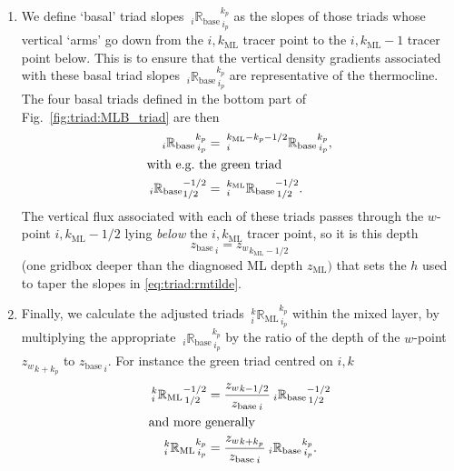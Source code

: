 \begin{enumerate}
\item We define `basal' triad slopes
${\:}_i{\mathbb{R}_\mathrm{base}}_{\,i_p}^{k_p}$ as the slopes
of those triads whose vertical `arms' go down from the
$i,k_\mathrm{ML}$ tracer point to the $i,k_\mathrm{ML}-1$ tracer point
below. This is to ensure that the vertical density gradients
associated with these basal triad slopes
${\:}_i{\mathbb{R}_\mathrm{base}}_{\,i_p}^{k_p}$ are
representative of the thermocline. The four basal triads defined in the bottom part
of Fig.~\ref{fig:triad:MLB_triad} are then
\begin{align}
  {\:}_i{\mathbb{R}_\mathrm{base}}_{\,i_p}^{k_p} &=
 {\:}^{k_\mathrm{ML}-k_p-1/2}_i{\mathbb{R}_\mathrm{base}}_{\,i_p}^{k_p}, \label{eq:triad:Rbase}
\\
\intertext{with e.g.\ the green triad}
{\:}_i{\mathbb{R}_\mathrm{base}}_{1/2}^{-1/2}&=
{\:}^{k_\mathrm{ML}}_i{\mathbb{R}_\mathrm{base}}_{\,1/2}^{-1/2}. \notag
\end{align}
The vertical flux associated with each of these triads passes through the $w$-point
$i,k_\mathrm{ML}-1/2$ lying \emph{below} the $i,k_\mathrm{ML}$ tracer point,
so it is this depth
\begin{equation}
  \label{eq:triad:zbase}
  {z_\mathrm{base}}_{\,i}={z_{w}}_{k_\mathrm{ML}-1/2}
\end{equation}
(one gridbox deeper than the
diagnosed ML depth $z_\mathrm{ML})$ that sets the $h$ used to taper
the slopes in \eqref{eq:triad:rmtilde}.
\item Finally, we calculate the adjusted triads
${\:}_i^k{\mathbb{R}_\mathrm{ML}}_{\,i_p}^{k_p}$ within the mixed
layer, by multiplying the appropriate
${\:}_i{\mathbb{R}_\mathrm{base}}_{\,i_p}^{k_p}$ by the ratio of
the depth of the $w$-point ${z_w}_{k+k_p}$ to ${z_\mathrm{base}}_{\,i}$. For
instance the green triad centred on $i,k$
\begin{align}
  {\:}_i^k{\mathbb{R}_\mathrm{ML}}_{\,1/2}^{-1/2} &=
\frac{{z_w}_{k-1/2}}{{z_\mathrm{base}}_{\,i}}{\:}_i{\mathbb{R}_\mathrm{base}}_{\,1/2}^{-1/2}
\notag \\
\intertext{and more generally}
 {\:}_i^k{\mathbb{R}_\mathrm{ML}}_{\,i_p}^{k_p} &=
\frac{{z_w}_{k+k_p}}{{z_\mathrm{base}}_{\,i}}{\:}_i{\mathbb{R}_\mathrm{base}}_{\,i_p}^{k_p}.\label{eq:triad:RML}
\end{align}
\end{enumerate}

